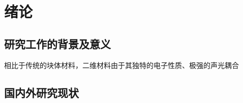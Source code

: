 \chapter{绪\hspace{6pt}论}

\section{研究工作的背景及意义}
相比于传统的块体材料，二维材料由于其独特的电子性质、极强的声光耦合


\section{国内外研究现状}